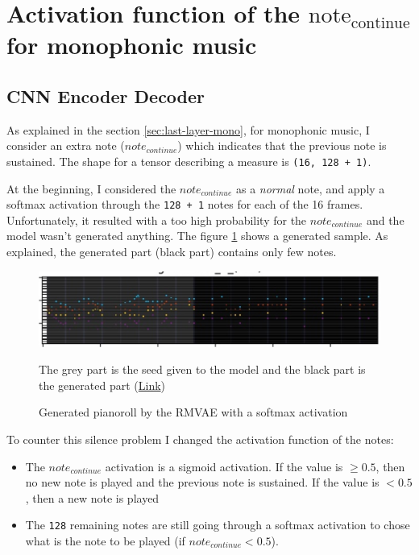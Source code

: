 \documentclass[12pt]{report}
\begin{document}


\section{Activation function of the $\text{note}_{\text{continue}}$ for monophonic music}
\label{sec:results:note-continue}

\subsection{CNN Encoder Decoder}

As explained in the section \ref{sec:last-layer-mono}, for monophonic music, I consider an extra note ($note_{continue}$) which indicates that the previous note is sustained.
The shape for a tensor describing a measure is \texttt{(16, 128 + 1)}.

At the beginning, I considered the $note_{continue}$ as a \textit{normal} note, and apply a softmax activation through the \texttt{128 + 1} notes for each of the 16 frames.
Unfortunately, it resulted with a too high probability for the $note_{continue}$ and the model wasn't generated anything.
The figure \ref{fig:rmvae-generated-silence} shows a generated sample.
As explained, the generated part (black part) contains only few notes.

\begin{figure}[htbp]
    \centering
    \includegraphics[width=\textwidth]{images/generated_midis/RMVAE/cnn_generation_silence.jpg}
    \caption{Generated pianoroll by the RMVAE with a softmax activation}
    The grey part is the seed given to the model and the black part is the generated part
    (\href{https://github.com/ValentinVignal/midiGenerator/blob/master/samples/results/generated_silence.mid}{Link})
    \label{fig:rmvae-generated-silence}
\end{figure}

To counter this silence problem I changed the activation function of the notes:
\begin{itemize}
    \item The $note_{continue}$ activation is a sigmoid activation.
    If the value is $\geq 0.5$, then no new note is played and the previous note is sustained.
    If the value is $< 0.5$, then a new note is played
    \item The \texttt{128} remaining notes are still going through a softmax activation to chose what is the note to be played (if $note_{continue} <0.5$).
\end{itemize}
\end{document}
